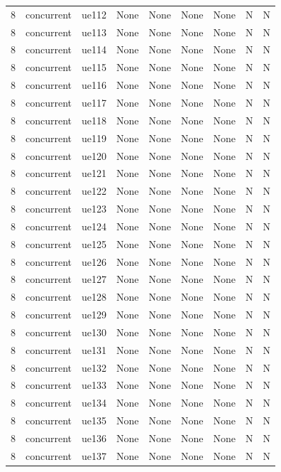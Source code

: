\begin{table}[ht]
\begin{tabular}{|c|c|c|c|c|c|c|c|c|}
8 & concurrent & ue112 & None & None & None & None & N & N \\
8 & concurrent & ue113 & None & None & None & None & N & N \\
8 & concurrent & ue114 & None & None & None & None & N & N \\
8 & concurrent & ue115 & None & None & None & None & N & N \\
8 & concurrent & ue116 & None & None & None & None & N & N \\
8 & concurrent & ue117 & None & None & None & None & N & N \\
8 & concurrent & ue118 & None & None & None & None & N & N \\
8 & concurrent & ue119 & None & None & None & None & N & N \\
8 & concurrent & ue120 & None & None & None & None & N & N \\
8 & concurrent & ue121 & None & None & None & None & N & N \\
8 & concurrent & ue122 & None & None & None & None & N & N \\
8 & concurrent & ue123 & None & None & None & None & N & N \\
8 & concurrent & ue124 & None & None & None & None & N & N \\
8 & concurrent & ue125 & None & None & None & None & N & N \\
8 & concurrent & ue126 & None & None & None & None & N & N \\
8 & concurrent & ue127 & None & None & None & None & N & N \\
8 & concurrent & ue128 & None & None & None & None & N & N \\
8 & concurrent & ue129 & None & None & None & None & N & N \\
8 & concurrent & ue130 & None & None & None & None & N & N \\
8 & concurrent & ue131 & None & None & None & None & N & N \\
8 & concurrent & ue132 & None & None & None & None & N & N \\
8 & concurrent & ue133 & None & None & None & None & N & N \\
8 & concurrent & ue134 & None & None & None & None & N & N \\
8 & concurrent & ue135 & None & None & None & None & N & N \\
8 & concurrent & ue136 & None & None & None & None & N & N \\
8 & concurrent & ue137 & None & None & None & None & N & N \\

\end{tabular}
\end{table}
